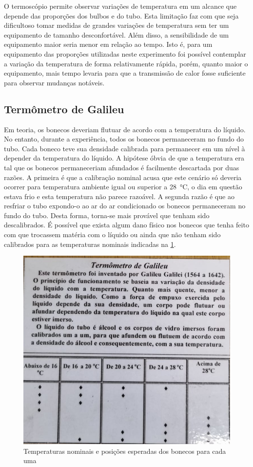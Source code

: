 O termoscópio permite observar variações de temperatura em um alcance que depende das proporções dos bulbos e do tubo. Esta limitação faz com que seja dificultoso tomar medidas de grandes variações de temperatura sem ter um equipamento de tamanho desconfortável. Além disso, a sensibilidade de um equipamento maior seria menor em relação ao tempo. Isto é, para um equipamento das proporções utilizadas neste experimento foi possível contemplar a variação da temperatura de forma relativamente rápida, porém, quanto maior o equipamento, mais tempo levaria para que a transmissão de calor fosse suficiente para observar mudanças notáveis. 

\subsection{Termômetro de Galileu}

Em teoria, os bonecos deveriam flutuar de acordo com a temperatura do líquido. No entanto, durante a experiência, todos os bonecos permaneceram no fundo do tubo. Cada boneco teve sua densidade calibrada para permanecer em um nível à depender da temperatura do líquido. A hipótese óbvia de que a temperatura era tal que os bonecos permaneceriam afundados é facilmente descartada por duas razões. A primeira é que a calibração nominal acusa que este cenário só deveria ocorrer para temperatura ambiente igual ou superior a \qty{28}{\celsius}, o dia em questão estava frio e esta temperatura não parece razoável. A segunda razão é que ao resfriar o tubo expondo-o ao ar do ar condicionado os bonecos permaneceram no fundo do tubo. Desta forma, torna-se mais provável que tenham sido descalibrados. É possível que exista algum dano físico nos bonecos que tenha feito com que trocassem matéria com o líquido ou ainda que não tenham sido calibrados para as temperaturas nominais indicadas na \cref{temps}.

\begin{figure}[ht]
    \centering
    \includegraphics[width=.5\linewidth]{fig/temps}
    \caption{Temperaturas nominais e posições esperadas dos bonecos para cada uma}\label{temps}
\end{figure}

